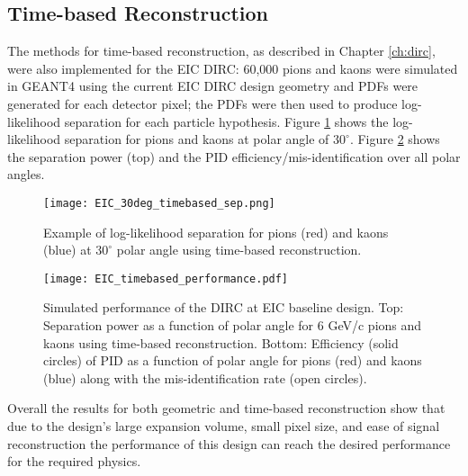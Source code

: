 \subsection{Time-based Reconstruction}
The methods for time-based reconstruction, as described in Chapter \ref{ch:dirc}, were also implemented for the EIC DIRC: 60,000 pions and kaons were simulated in GEANT4 using the current EIC DIRC design geometry and PDFs were generated for each detector pixel; the PDFs were then used to produce log-likelihood separation for each particle hypothesis. Figure \ref{fig:EIC_timebased_ex} shows the log-likelihood separation for pions and kaons at polar angle of $30^\circ$.  Figure \ref{fig:EIC_timebased_performance} shows the separation power (top) and the PID efficiency/mis-identification over all polar angles.

\begin{figure}[!htb]
	\centering
	\texttt{[image: EIC\_30deg\_timebased\_sep.png]}
	\caption{Example of log-likelihood separation for pions (red) and kaons (blue) at $30^\circ$ polar angle using time-based reconstruction.}
	\label{fig:EIC_timebased_ex}
\end{figure}

\begin{figure}[!htb]
	\centering
	\texttt{[image: EIC\_timebased\_performance.pdf]}
	\caption[Simulated performance of the DIRC at EIC baseline design.]{Simulated performance of the DIRC at EIC baseline design. Top: Separation power as a function of polar angle for 6 GeV/c pions and kaons using time-based reconstruction. Bottom: Efficiency (solid circles) of PID as a function of polar angle for pions (red) and kaons (blue) along with the mis-identification rate (open circles).}
	\label{fig:EIC_timebased_performance}
\end{figure}

Overall the results for both geometric and time-based reconstruction show that due to the design's large expansion volume, small pixel size, and ease of signal reconstruction the performance of this design can reach the desired performance for the required physics.
